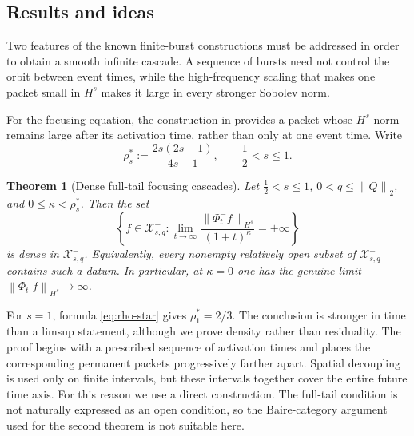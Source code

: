 \documentclass[11pt,reqno]{amsart}
\numberwithin{equation}{section}
\newtheorem{theorem}{Theorem}[section]
\theoremstyle{remark}
\newcommand{\X}{\mathcal X}
\newcommand{\half}{\frac12}
\newcommand{\norm}[1]{\left\lVert #1\right\rVert}
\newcommand{\flow}[1]{\Phi^{#1}}
\begin{document}
\subsection{Results and ideas}

Two features of the known finite-burst constructions must be addressed in
order to obtain a smooth infinite cascade.  A sequence of bursts need not
control the orbit between event times, while the high-frequency scaling that
makes one packet small in $H^s$ makes it large in every stronger Sobolev norm.

For the focusing equation, the construction in \cite{GLPR} provides a packet whose
$H^s$ norm remains large after its activation time, rather than only at one
event time.  Write
\begin{equation}\label{eq:rho-star}
 \rho_s^*:=\frac{2s(2s-1)}{4s-1},
 \qquad \half<s\leq1.
\end{equation}

\begin{theorem}[Dense full-tail focusing cascades]\label{thm:limit}
Let $\half<s\leq1$, $0<q\leq\norm Q_2$, and
$0\leq\kappa<\rho_s^*$.  Then the set
\begin{equation}\label{eq:limit-set}
 \left\{f\in\X^-_{s,q}:
 \lim_{t\to\infty}
 \frac{\norm{\flow-_tf}_{H^s}}{(1+t)^\kappa}=+\infty\right\}
\end{equation}
is dense in $\X^-_{s,q}$.  Equivalently, every nonempty relatively open
subset of $\X^-_{s,q}$ contains such a datum.  In particular, at $\kappa=0$
one has the genuine limit $\norm{\flow-_tf}_{H^s}\to\infty$.
\end{theorem}

For $s=1$, formula \eqref{eq:rho-star} gives $\rho_1^*=2/3$.  The conclusion is
stronger in time than a limsup statement, although we prove density rather
than residuality.  The proof begins with a prescribed sequence of activation
times and places the corresponding permanent packets progressively farther
apart.  Spatial decoupling is used only on finite intervals, but these
intervals together cover the entire future time axis.  For this reason we use
a direct construction.  The full-tail condition is not naturally expressed
as an open condition, so the Baire-category argument used for the second
theorem is not suitable here.
\end{document}
